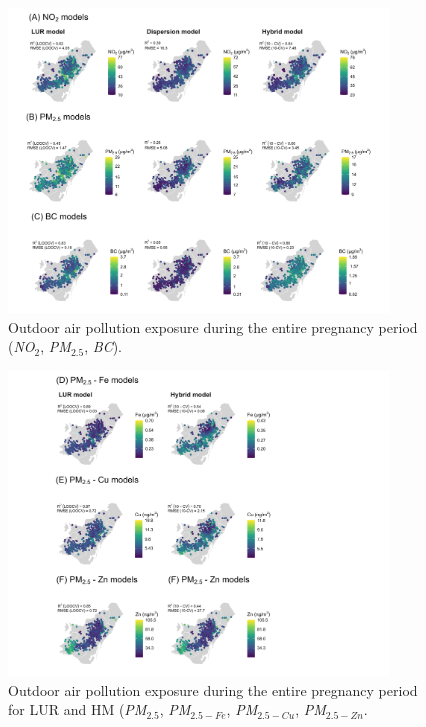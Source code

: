 \documentclass{article}
\begin{document}
\captionsetup[figure]{skip=6pt}
\begin{figure}[!htb]
\includegraphics[width=0.9\textwidth]{figures/combined_figure1_v2.png}
\caption{Outdoor air pollution exposure during the entire pregnancy period (\textit{NO$_2$}, \textit{PM$_{2.5}$}, \textit{BC}).}
\label{fig2}
\end{figure}

\captionsetup[figure]{skip=6pt}
\begin{figure}[!htb]
\includegraphics[width=0.9\textwidth]{figures/combined_figure2_v2.png}
\caption{Outdoor air pollution exposure during the entire pregnancy period for LUR and HM (\textit{PM$_{2.5}$}, \textit{PM$_{2.5-Fe}$}, \textit{PM$_{2.5-Cu}$}, \textit{PM$_{2.5-Zn}$}.}
\label{fig3}
\end{figure}
\end{document}
